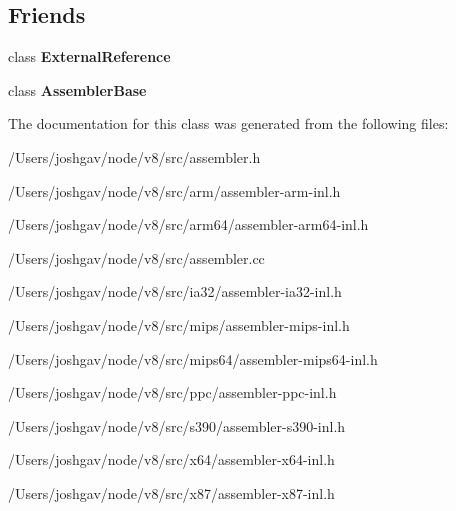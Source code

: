\subsection*{Friends}
\begin{DoxyCompactItemize}
\item 
class {\bfseries External\+Reference}\hypertarget{classv8_1_1internal_1_1_cpu_features_a6cad52a007e84a78f169131b667e2d49}{}\label{classv8_1_1internal_1_1_cpu_features_a6cad52a007e84a78f169131b667e2d49}

\item 
class {\bfseries Assembler\+Base}\hypertarget{classv8_1_1internal_1_1_cpu_features_a528f19176d1524b91b7f48bcbdc2bc9c}{}\label{classv8_1_1internal_1_1_cpu_features_a528f19176d1524b91b7f48bcbdc2bc9c}

\end{DoxyCompactItemize}


The documentation for this class was generated from the following files\+:\begin{DoxyCompactItemize}
\item 
/\+Users/joshgav/node/v8/src/assembler.\+h\item 
/\+Users/joshgav/node/v8/src/arm/assembler-\/arm-\/inl.\+h\item 
/\+Users/joshgav/node/v8/src/arm64/assembler-\/arm64-\/inl.\+h\item 
/\+Users/joshgav/node/v8/src/assembler.\+cc\item 
/\+Users/joshgav/node/v8/src/ia32/assembler-\/ia32-\/inl.\+h\item 
/\+Users/joshgav/node/v8/src/mips/assembler-\/mips-\/inl.\+h\item 
/\+Users/joshgav/node/v8/src/mips64/assembler-\/mips64-\/inl.\+h\item 
/\+Users/joshgav/node/v8/src/ppc/assembler-\/ppc-\/inl.\+h\item 
/\+Users/joshgav/node/v8/src/s390/assembler-\/s390-\/inl.\+h\item 
/\+Users/joshgav/node/v8/src/x64/assembler-\/x64-\/inl.\+h\item 
/\+Users/joshgav/node/v8/src/x87/assembler-\/x87-\/inl.\+h\end{DoxyCompactItemize}
